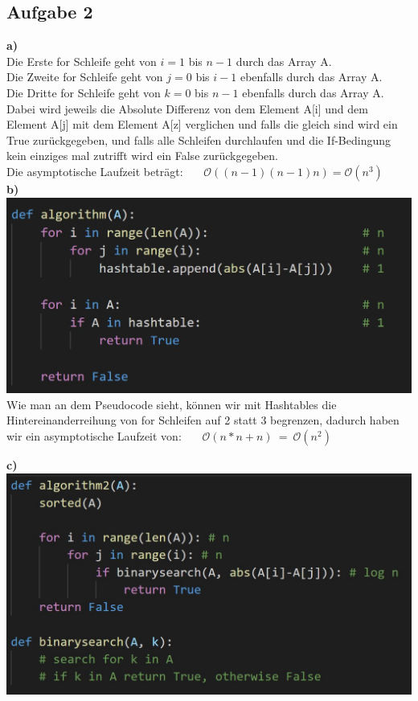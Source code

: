 \documentclass[12pt,a4paper,headsepline]{scrreprt}
\begin{document}
\subsection*{Aufgabe 2}
\textbf{a)}\\
Die Erste for Schleife geht von $i=1$ bis $n-1$ durch das Array A.\\
Die Zweite for Schleife geht von $j=0$ bis $i-1$ ebenfalls durch das Array A.\\
Die Dritte for Schleife geht von $k=0$ bis $n-1$ ebenfalls durch das Array A.\\
Dabei wird jeweils die Absolute Differenz von dem Element A[i] und dem Element A[j] mit dem Element A[z] verglichen und falls die gleich sind wird ein True zurückgegeben, und falls alle Schleifen durchlaufen und die If-Bedingung kein einziges mal zutrifft wird ein False zurückgegeben.\\

Die asymptotische Laufzeit beträgt:~~~ $\mathcal{O}((n-1)(n-1)n) = \mathcal{O}(n^3)$\\

\textbf{b)}\\
\includegraphics[scale=0.8]{2b.jpg}\\

Wie man an dem Pseudocode sieht, können wir mit Hashtables die Hintereinanderreihung von for Schleifen auf 2 statt 3 begrenzen, dadurch haben wir ein asymptotische Laufzeit von:~~~ $\mathcal{O}(n*n + n) ~=~ \mathcal{O}(n^2)$
\clearpage

\textbf{c)}\\
\includegraphics[scale=0.77]{2c.jpg}\\
\end{document}
